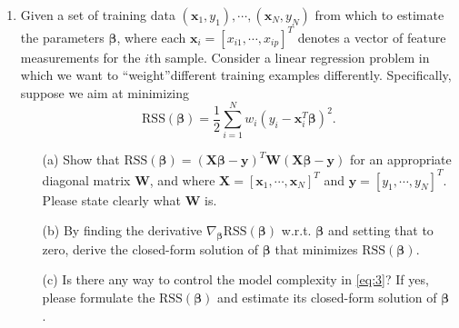 \documentclass[10pt]{article}
\begin{document}
\begin{enumerate}[1.]
	      \newpage

	\item {} Given a set of training data $(\mathbf{x}_{1},y_1),\cdots,(\mathbf{x}_{N},y_N)$ from which to estimate the parameters $\bm{\beta}$,
	      where each $\mathbf{x}_{i} = \left[x_{i1},\cdots,x_{ip} \right]^{T}$ denotes a vector of feature measurements for the $i$th sample.
	      Consider a linear regression problem in which we want to \textquotedblleft weight\textquotedblright different training examples differently.
	      Specifically, suppose we aim at minimizing
	      \begin{equation}
		      \textrm{RSS}(\bm{\beta}) = \frac{1}{2}\sum_{i=1}^{N}w_{i}(y_{i} -\mathbf{x}_{i}^{T}\bm{\beta})^{2}.
		      \label{eq:3}
	      \end{equation}
	      \begin{itemize}
		      \item[(a)] Show that $\textrm{RSS}(\bm{\beta}) = (\mathbf{X}\bm{\beta} - \mathbf{y})^{T}\mathbf{W}(\mathbf{X}\bm{\beta}-\mathbf{y})$
		            for an appropriate diagonal matrix $\mathbf{W}$, and where $\mathbf{X} = \left[\mathbf{x}_{1},\cdots,\mathbf{x}_{N} \right]^{T}$ and $\mathbf{y} = \left[y_1,\cdots,y_N \right]^{T}$.
		            Please state clearly what $\mathbf{W}$ is. ~

		      \item[(b)] By finding the derivative $\nabla_{\bm{\beta}}\textrm{RSS}(\bm{\beta})$ w.r.t. $\bm\beta$ and setting that to zero,
		            derive the closed-form solution of $\bm{\beta}$ that minimizes $\textrm{RSS}(\bm{\beta})$.~

		      \item[(c)] Is there any way to control the model complexity in \eqref{eq:3}? If yes,
		            please formulate the $\textrm{RSS}(\bm\beta)$ and estimate its closed-form solution of $\bm\beta$.~


\end{itemize}
\end{enumerate}
\end{document}
